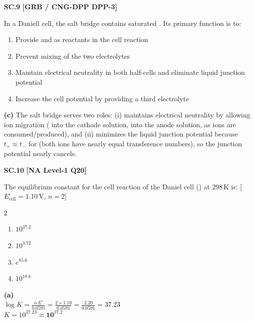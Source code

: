 \begin{problembox}
\textbf{SC.9} \hfill \textbf{[GRB / CNG-DPP DPP-3]}

In a Daniell cell, the salt bridge contains saturated . Its primary function is to:
\begin{enumerate}[label=(\alph*)]
    \item Provide  and  as reactants in the cell reaction
    \item Prevent mixing of the two electrolytes
    \item Maintain electrical neutrality in both half-cells and eliminate liquid junction potential
    \item Increase the cell potential by providing a third electrolyte
\end{enumerate}
\end{problembox}
\begin{solution}
\textbf{(c)} The salt bridge serves two roles: (i) maintains electrical neutrality by allowing ion migration ( into the cathode solution,  into the anode solution, as ions are consumed/produced), and (ii) minimizes the liquid junction potential because $t_+ \approx t_-$ for  (both ions have nearly equal transference numbers), so the junction potential nearly cancels.
\end{solution}

\begin{problembox}
\textbf{SC.10} \hfill \textbf{[NA Level-1 Q20]}

The equilibrium constant for the cell reaction of the Daniel cell () at $298\,\text{K}$ is: [$E^\circ_{\text{cell}} = 1.10\,\text{V}$, $n=2$]
\begin{multicols}{2}
\begin{enumerate}[label=(\alph*)]
    \item $10^{37.2}$
    \item $10^{3.72}$
    \item $e^{85.6}$
    \item $10^{18.6}$
\end{enumerate}
\end{multicols}
\end{problembox}
\begin{solution}
\textbf{(a)}\\
$\log K = \frac{n\,E^\circ}{0.0591} = \frac{2\times1.10}{0.0591} = \frac{2.20}{0.0591} = 37.23$\\
$K = 10^{37.23} \approx \mathbf{10^{37.2}}$
\end{solution}
